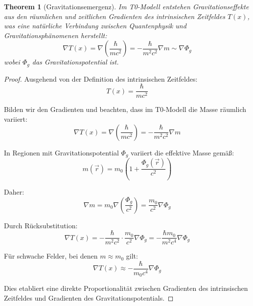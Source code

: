 \documentclass{article}
\newtheorem{theorem}{Theorem}[section]
\theoremstyle{definition}
\theoremstyle{remark}
\newcommand{\Tfield}{T(x)} %
\begin{document}
		\begin{theorem}[Gravitationsemergenz]
			Im T0-Modell entstehen Gravitationseffekte aus den räumlichen und zeitlichen Gradienten des intrinsischen Zeitfeldes $\Tfield$, was eine natürliche Verbindung zwischen Quantenphysik und Gravitationsphänomenen herstellt:
			\begin{equation}
				\nabla \Tfield = \nabla \left(\frac{\hbar}{mc^2}\right) = -\frac{\hbar}{m^2c^2}\nabla m \sim \nabla \Phi_g
			\end{equation}
			wobei $\Phi_g$ das Gravitationspotential ist.
		\end{theorem}
		
		\begin{proof}
			Ausgehend von der Definition des intrinsischen Zeitfeldes:
			\begin{equation}
				\Tfield = \frac{\hbar}{mc^2}
			\end{equation}
			
			Bilden wir den Gradienten und beachten, dass im T0-Modell die Masse räumlich variiert:
			\begin{equation}
				\nabla \Tfield = \nabla \left(\frac{\hbar}{mc^2}\right) = -\frac{\hbar}{m^2c^2}\nabla m
			\end{equation}
			
			In Regionen mit Gravitationspotential $\Phi_g$ variiert die effektive Masse gemäß:
			\begin{equation}
				m(\vec{r}) = m_0\left(1 + \frac{\Phi_g(\vec{r})}{c^2}\right)
			\end{equation}
			
			Daher:
			\begin{equation}
				\nabla m = m_0 \nabla\left(\frac{\Phi_g}{c^2}\right) = \frac{m_0}{c^2}\nabla\Phi_g
			\end{equation}
			
			Durch Rücksubstitution:
			\begin{equation}
				\nabla \Tfield = -\frac{\hbar}{m^2c^2}\cdot\frac{m_0}{c^2}\nabla\Phi_g = -\frac{\hbar m_0}{m^2c^4}\nabla\Phi_g
			\end{equation}
			
			Für schwache Felder, bei denen $m \approx m_0$ gilt:
			\begin{equation}
				\nabla \Tfield \approx -\frac{\hbar}{m_0c^4}\nabla\Phi_g
			\end{equation}
			
			Dies etabliert eine direkte Proportionalität zwischen Gradienten des intrinsischen Zeitfeldes und Gradienten des Gravitationspotentials.
		\end{proof}
		
\end{document}
